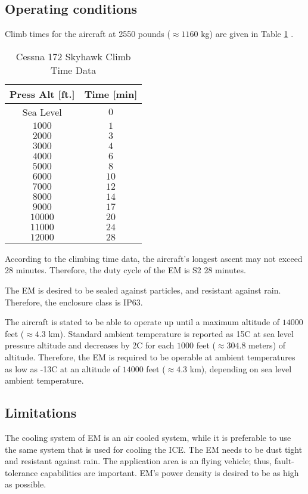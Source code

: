 \documentclass[11pt, a4paper]{article}
\begin{document}
	\subsection{Operating conditions}
	Climb times for the aircraft at 2550 pounds ($\approx1160$ kg) are given in Table \ref{tab:climbTime} \cite{172SIM}.
	\begin{table}[h]
		\begin{center}
			\begin{tabular}{c|c}
				Press Alt [ft.] &  Time [min] \\
				\hline
				Sea Level & $0$ \\
				$1000$ & $1$ \\
				$2000$ & $3$ \\
				$3000$ & $4$ \\
				$4000$ & $6$ \\
				$5000$ & $8$ \\
				$6000$ & $10$ \\
				$7000$ & $12$ \\
				$8000$ & $14$ \\
				$9000$ & $17$ \\
				$10000$ & $20$ \\
				$11000$ & $24$ \\
				$12000$ & $28$
			\end{tabular}
		\end{center}
		\caption{Cessna 172 Skyhawk Climb Time Data}
		\label{tab:climbTime}
	\end{table}
	According to the climbing time data, the aircraft's longest ascent may not exceed 28 minutes. Therefore, the duty cycle of the EM is S2 28 minutes.
	
	The EM is desired to be sealed against particles, and resistant against rain. Therefore, the enclosure class is IP63. 
	
	The aircraft is stated to be able to operate up until a maximum altitude of $14000$ feet ($\approx4.3$ km).
	Standard ambient temperature is reported as 15\textdegree C at sea level pressure altitude and decreases by 2\textdegree C for each $1000$ feet ($\approx304.8$ meters) of altitude. Therefore, the EM is required to be operable at ambient temperatures as low as -13\textdegree C at an altitude of $14000$ feet ($\approx4.3$ km), depending on sea level ambient temperature.
	
	\subsection{Limitations}
	The cooling system of EM is an air cooled system, while it is preferable to use the same system that is used for cooling the ICE. The EM needs to be dust tight and resistant against rain. The application area is an flying vehicle; thus, fault-tolerance capabilities are important. EM's power density is desired to be as high as possible.
\end{document}
